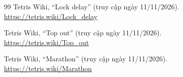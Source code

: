 \documentclass[12pt,a4paper,oneside]{report}
\begin{document}
\begin{thebibliography}{99}
Tetris Wiki, ``Lock delay''
(truy cập ngày 11/11/2026).\\
\url{https://tetris.wiki/Lock_delay}

Tetris Wiki, ``Top out''
(truy cập ngày 11/11/2026).\\
\url{https://tetris.wiki/Top_out}

Tetris Wiki, ``Marathon''
(truy cập ngày 11/11/2026).\\
\url{https://tetris.wiki/Marathon}

\end{thebibliography}
\end{document}
